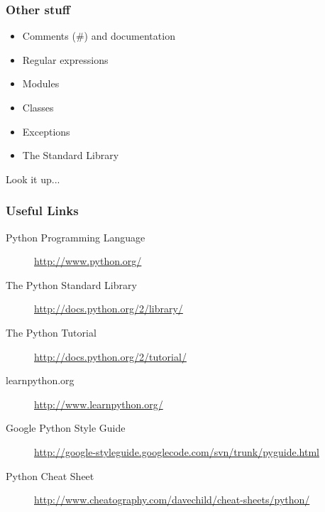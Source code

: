 \documentclass{beamer}
\begin{document}
\begin{frame}
    \frametitle{Other stuff}
    \begin{itemize}
    \item Comments (\#) and documentation
    \item Regular expressions
    \item Modules
    \item Classes
    \item Exceptions
    \item The Standard Library
    \end{itemize}
    Look it up...
\end{frame}

\begin{frame}
    \frametitle{Useful Links}    
    \begin{description}
    \item[Python Programming Language] \url{http://www.python.org/}
    \item[The Python Standard Library] \url{http://docs.python.org/2/library/}
    \item[The Python Tutorial] \url{http://docs.python.org/2/tutorial/}
    \item[learnpython.org] \url{http://www.learnpython.org/}
    \item[Google Python Style Guide] \url{http://google-styleguide.googlecode.com/svn/trunk/pyguide.html}
    \item[Python Cheat Sheet] \url{http://www.cheatography.com/davechild/cheat-sheets/python/}
    \end{description}
\end{frame}
\end{document}
